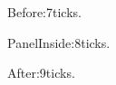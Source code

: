 \documentclass{beamer}
\date{}
\newcommand{\unit}{ms}
\let\change\renewcommand
\begin{document}
\begin{frame}[t]
\change{\unit}{ticks}
Before:7\unit.
\begin{block}{Panel}Inside:8\unit.\end{block}
After:9\unit.
\end{frame}
\end{document}
